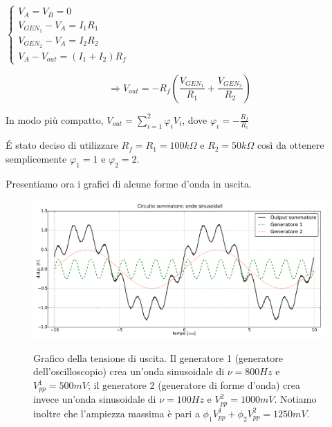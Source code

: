 $\begin{cases} V_A=V_B=0 \\ V_{{GEN}_1} - V_A =I_1 R_1  \\ V_{{GEN}_2} - V_A =I_2 R_2 \\ V_A - V_{out} =(I_1+I_2) R_f \end{cases} $


$$\Rightarrow V_{out}=-R_f \left( \frac{V_{{GEN}_1}}{R_1}+\frac{V_{{GEN}_2}}{R_2}\right)$$


In modo più compatto, $V_{out}=\sum^{2}_{i=1} \varphi_i V_{i}$, dove $\varphi_i=-\frac{R_f}{R_i}$ 

\'E stato deciso di utilizzare $R_f=R_1=100 k\Omega$ e $R_2=50 k\Omega$ così da ottenere semplicemente $\varphi_1=1$ e $\varphi_2=2$.

Presentiamo ora i grafici di alcune forme d'onda in uscita.

\begin{figure}[ht]
 \centering
   {\includegraphics[width=18cm]{../E01/latex/sinsin.pdf}}
 \caption{Grafico della tensione di uscita. Il generatore 1 (generatore dell'oscilloscopio) crea un'onda sinusoidale di $\nu=800 Hz$ e $V^1_{pp}=500 mV$; il generatore 2 (generatore di forme d'onda) crea invece un'onda sinusoidale di $\nu=100 Hz$ e $V^2_{pp}=1000 mV$. Notiamo inoltre che l'ampiezza massima è pari a $\phi_1 V^1_{pp}+\phi_2 V^2_{pp}=1250 mV$.}
 \label{gr:onde1}
\end{figure}

